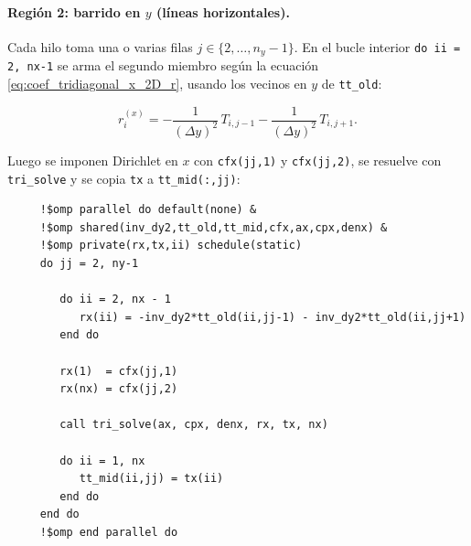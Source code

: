 \documentclass[11pt,a4paper]{article}
\begin{document}
\paragraph{Regi\'on 2: barrido en $y$ (l\'ineas horizontales).}
Cada hilo toma una o varias filas $j\in\{2,\ldots,n_y-1\}$. En el bucle interior
\texttt{do ii = 2, nx-1} se arma el segundo miembro seg\'un la ecuaci\'on
\ref{eq:coef_tridiagonal_x_2D_r}, usando los vecinos en $y$ de \texttt{tt\_old}:

\begin{equation}
r_i^{(x)} = -\frac{1}{(\Delta y)^2}\,T_{i,j-1}-\frac{1}{(\Delta y)^2}\,T_{i,j+1}.
\end{equation}

Luego se imponen Dirichlet en $x$ con \texttt{cfx(jj,1)} y \texttt{cfx(jj,2)},
se resuelve con \texttt{tri\_solve} y se copia \texttt{tx} a \texttt{tt\_mid(:,jj)}:

\begin{verbatim}
     !$omp parallel do default(none) &
     !$omp shared(inv_dy2,tt_old,tt_mid,cfx,ax,cpx,denx) &
     !$omp private(rx,tx,ii) schedule(static)
     do jj = 2, ny-1

        do ii = 2, nx - 1
           rx(ii) = -inv_dy2*tt_old(ii,jj-1) - inv_dy2*tt_old(ii,jj+1)
        end do

        rx(1)  = cfx(jj,1)
        rx(nx) = cfx(jj,2)

        call tri_solve(ax, cpx, denx, rx, tx, nx)

        do ii = 1, nx
           tt_mid(ii,jj) = tx(ii)
        end do
     end do
     !$omp end parallel do
\end{verbatim}
\end{document}
